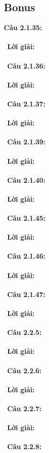 \documentclass[a4paper]{article}
\begin{document}
\subsection{Bonus}
\textbf{Câu 2.1.35: } \\\ \\\
\textbf{Lời giải:} \\\ \\\
\textbf{Câu 2.1.36: } \\\ \\\
\textbf{Lời giải:} \\\ \\\
\textbf{Câu 2.1.37: } \\\ \\\
\textbf{Lời giải:} \\\ \\\
\textbf{Câu 2.1.39: } \\\ \\\
\textbf{Lời giải:} \\\ \\\
\textbf{Câu 2.1.40: } \\\ \\\
\textbf{Lời giải:} \\\ \\\
\textbf{Câu 2.1.45: } \\\ \\\
\textbf{Lời giải:} \\\ \\\
\textbf{Câu 2.1.46: } \\\ \\\
\textbf{Lời giải:} \\\ \\\
\textbf{Câu 2.1.47: } \\\ \\\
\textbf{Lời giải:} \\\ \\\
\textbf{Câu 2.2.5: } \\\ \\\
\textbf{Lời giải:} \\\ \\\
\textbf{Câu 2.2.6: } \\\ \\\
\textbf{Lời giải:} \\\ \\\
\textbf{Câu 2.2.7: } \\\ \\\
\textbf{Lời giải:} \\\ \\\
\textbf{Câu 2.2.8: } \\\ \\\
\end{document}
